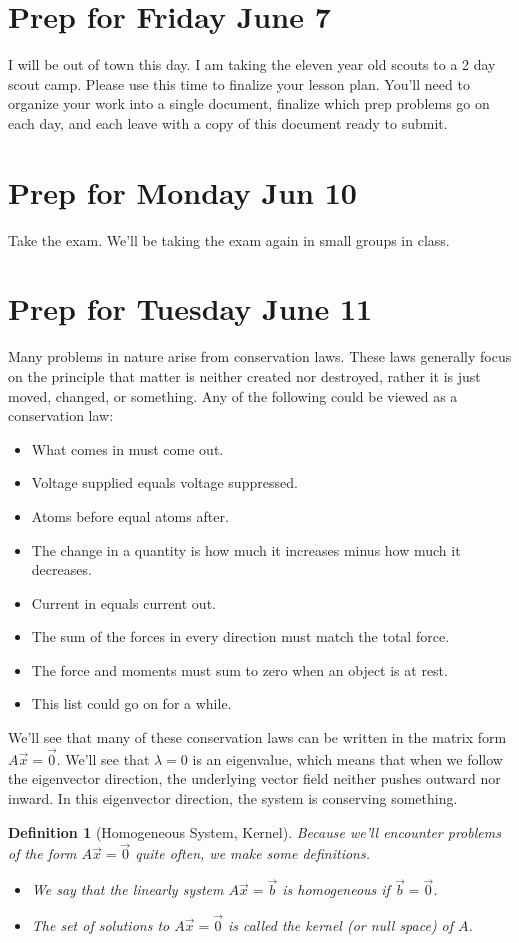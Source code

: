 \documentclass[letterpaper,oneside]{book}%
\theoremstyle{plain}
\theoremstyle{box}
\newtheorem{definition}[theorem]{Definition}
\theoremstyle{problem}
\begin{document}
\section{Prep for Friday June 7}
I will be out of town this day. I am taking the eleven year old scouts to a 2 day scout camp.  Please use this time to finalize your lesson plan.  You'll need to organize your work into a single document, finalize which prep problems go on each day, and each leave with a copy of this document ready to submit. 


\section{Prep for Monday Jun 10}
Take the exam.  We'll be taking the exam again in small groups in class.

\section{Prep for Tuesday June 11}


Many problems in nature arise from conservation laws.  These laws generally focus on the principle that matter is neither created nor destroyed, rather it is just moved, changed, or something.  Any of the following could be viewed as a conservation law:
\begin{itemize}
 \item What comes in must come out.
 \item Voltage supplied equals voltage suppressed.
 \item Atoms before equal atoms after.
 \item The change in a quantity is how much it increases minus how much it decreases.
 \item Current in equals current out.
 \item The sum of the forces in every direction must match the total force.
 \item The force and moments must sum to zero when an object is at rest.
 \item This list could go on for a while.
\end{itemize}
We'll see that many of these conservation laws can be written in the matrix form $A\vec x=\vec 0$. We'll see that $\lambda=0$ is an eigenvalue, which means that when we follow the eigenvector direction, the underlying vector field neither pushes outward nor inward. In this eigenvector direction, the system is conserving something.
\begin{definition}[Homogeneous System, Kernel]
Because we'll encounter problems of the form $A\vec x = \vec 0$ quite often, we make some definitions. 
\begin{itemize}
 \item We say that the linearly system $A\vec x=\vec b$ is homogeneous if $\vec b=\vec 0$. 
 \item The set of solutions to $A\vec x=\vec 0$ is called the kernel (or null space) of $A$.  
\end{itemize}
\end{definition}
\end{document}
